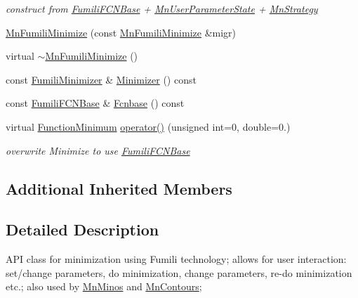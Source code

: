 \begin{DoxyCompactItemize}
\begin{DoxyCompactList}\small\item\em construct from \mbox{\hyperlink{classROOT_1_1Minuit2_1_1FumiliFCNBase}{Fumili\+F\+C\+N\+Base}} + \mbox{\hyperlink{classROOT_1_1Minuit2_1_1MnUserParameterState}{Mn\+User\+Parameter\+State}} + \mbox{\hyperlink{classROOT_1_1Minuit2_1_1MnStrategy}{Mn\+Strategy}} \end{DoxyCompactList}\item 
\mbox{\hyperlink{classROOT_1_1Minuit2_1_1MnFumiliMinimize_a082eb87753b71a4d383ff8d735dc8410}{Mn\+Fumili\+Minimize}} (const \mbox{\hyperlink{classROOT_1_1Minuit2_1_1MnFumiliMinimize}{Mn\+Fumili\+Minimize}} \&migr)
\item 
virtual \mbox{\hyperlink{classROOT_1_1Minuit2_1_1MnFumiliMinimize_ab999713e15397b9373551207f05786c5}{$\sim$\+Mn\+Fumili\+Minimize}} ()
\item 
const \mbox{\hyperlink{classROOT_1_1Minuit2_1_1FumiliMinimizer}{Fumili\+Minimizer}} \& \mbox{\hyperlink{classROOT_1_1Minuit2_1_1MnFumiliMinimize_a96eb0cf96ae7ec874f912b6d2b3e7990}{Minimizer}} () const
\item 
const \mbox{\hyperlink{classROOT_1_1Minuit2_1_1FumiliFCNBase}{Fumili\+F\+C\+N\+Base}} \& \mbox{\hyperlink{classROOT_1_1Minuit2_1_1MnFumiliMinimize_a4540fd0311c15810965864988d4c70d1}{Fcnbase}} () const
\item 
virtual \mbox{\hyperlink{classROOT_1_1Minuit2_1_1FunctionMinimum}{Function\+Minimum}} \mbox{\hyperlink{classROOT_1_1Minuit2_1_1MnFumiliMinimize_a58da42cb9def0b42c424a3121987e77b}{operator()}} (unsigned int=0, double=0.)
\begin{DoxyCompactList}\small\item\em overwrite Minimize to use \mbox{\hyperlink{classROOT_1_1Minuit2_1_1FumiliFCNBase}{Fumili\+F\+C\+N\+Base}} \end{DoxyCompactList}\end{DoxyCompactItemize}
\subsection*{Additional Inherited Members}


\subsection{Detailed Description}
A\+PI class for minimization using Fumili technology; allows for user interaction\+: set/change parameters, do minimization, change parameters, re-\/do minimization etc.; also used by \mbox{\hyperlink{classROOT_1_1Minuit2_1_1MnMinos}{Mn\+Minos}} and \mbox{\hyperlink{classROOT_1_1Minuit2_1_1MnContours}{Mn\+Contours}}; 

